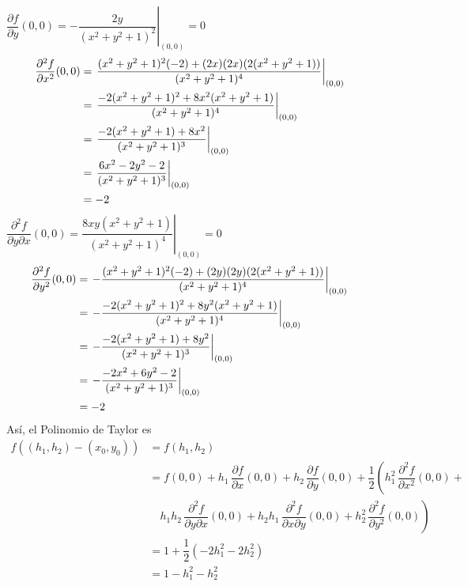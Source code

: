 \documentclass[fleqn, 12pt]{article}
\newcommand{\derivadaparcial}[2]{\dfrac{\partial {#1}}{\partial {#2}}}
\newcommand{\derivadaparcialn}[3]{\dfrac{\partial^{#3} {#1}}{\partial {#2}^{#3}}}
\newcommand{\derivadaparcialnd}[3]{\dfrac{\partial^{2} {#1}}{\partial {#3} \partial {#2}}}
\begin{document}
\begin{enumerate}
        $ \derivadaparcial{f}{y} (0,0) = \left. - \dfrac{2y}{(x^2 + y^2 + 1)^2} \right|_{(0,0)} = 0 $
        \begin{align*}
            \hspace{-10mm} \derivadaparcialn{f}{x}{2} (0,0) &= \left. \dfrac{(x^2 + y^2 + 1)^2 (-2) + (2x)(2x)(2(x^2 + y^2 + 1))}{(x^2 + y^2 + 1)^4} \right|_{(0,0)} \\
            &= \left. \dfrac{-2(x^2 + y^2 + 1)^2 + 8x^2 (x^2 + y^2 + 1)}{(x^2 + y^2 + 1)^4} \right|_{(0,0)} \\
            &= \left. \dfrac{-2(x^2 + y^2 + 1) + 8x^2}{(x^2 + y^2 + 1)^3} \right|_{(0,0)} \\
            &= \left. \dfrac{6x^2 - 2y^2 - 2}{(x^2 + y^2 + 1)^3} \right|_{(0,0)} \\
            &= -2
        \end{align*}
        $ \derivadaparcialnd{f}{x}{y} (0,0) = \left. \dfrac{8xy(x^2 + y^2 + 1)}{(x^2 + y^2 + 1)^4} \right|_{(0,0)} = 0 $
        \begin{align*}
            \hspace{-10mm} \derivadaparcialn{f}{y}{2} (0,0) &= \left. - \dfrac{(x^2 + y^2 + 1)^2 (-2) + (2y)(2y)(2(x^2 + y^2 + 1))}{(x^2 + y^2 + 1)^4} \right|_{(0,0)} \\
            &= \left. - \dfrac{-2(x^2 + y^2 + 1)^2 + 8y^2 (x^2 + y^2 + 1)}{(x^2 + y^2 + 1)^4} \right|_{(0,0)} \\
            &= \left. - \dfrac{-2(x^2 + y^2 + 1) + 8y^2}{(x^2 + y^2 + 1)^3} \right|_{(0,0)} \\
            &= \left. - \dfrac{-2x^2 + 6y^2 - 2}{(x^2 + y^2 + 1)^3} \right|_{(0,0)} \\
            &= -2
        \end{align*}
        Así, el Polinomio de Taylor es
        \begin{align*}
            f((h_1, h_2) - (x_0, y_0)) &= f(h_1, h_2) \\
            &= f(0,0) + h_1 \, \derivadaparcial{f}{x} (0,0) + h_2 \, \derivadaparcial{f}{y} (0,0) + \dfrac{1}{2} \left( h_1^2 \, \derivadaparcialn{f}{x}{2} (0,0) \right. + \\
            & \quad \left. h_1 h_2 \, \derivadaparcialnd{f}{x}{y} (0,0) + h_2 h_1 \, \derivadaparcialnd{f}{y}{x} (0,0) + h_2^2 \, \derivadaparcialn{f}{y}{2} (0,0) \right) \\
            &= 1 + \dfrac{1}{2} \left( -2 h_1^2 - 2 h_2^2 \right) \\
            &= 1 - h_1^2 - h_2^2
        \end{align*}


\end{enumerate}
\end{document}
